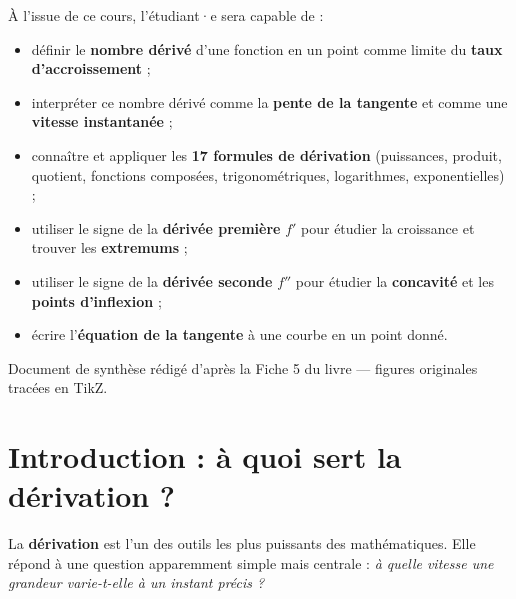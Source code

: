 \documentclass[11pt,a4paper]{article}
\begin{document}
\begin{tcolorbox}[boxbase,colback=primary!5,colframe=primary,width=15cm,
    title={\textsc{Objectifs pédagogiques de la fiche}}]
À l'issue de ce cours, l'étudiant·e sera capable de :
\begin{itemize}[leftmargin=1.6em,topsep=2pt,itemsep=1pt]
  \item définir le \textbf{nombre dérivé} d'une fonction en un point comme limite du \textbf{taux d'accroissement} ;
  \item interpréter ce nombre dérivé comme la \textbf{pente de la tangente} et comme une \textbf{vitesse instantanée} ;
  \item connaître et appliquer les \textbf{17 formules de dérivation} (puissances, produit, quotient, fonctions composées, trigonométriques, logarithmes, exponentielles) ;
  \item utiliser le signe de la \textbf{dérivée première} $f'$ pour étudier la croissance et trouver les \textbf{extremums} ;
  \item utiliser le signe de la \textbf{dérivée seconde} $f''$ pour étudier la \textbf{concavité} et les \textbf{points d'inflexion} ;
  \item écrire l'\textbf{équation de la tangente} à une courbe en un point donné.
\end{itemize}
\end{tcolorbox}

\vspace{0.4cm}
{\small\color{black!60} Document de synthèse rédigé d'après la Fiche 5 du livre — figures originales tracées en TikZ.}
\par
\endgroup

\newpage
\renewcommand{\contentsname}{\textcolor{primarydark}{Table des matières}}
\tableofcontents
\thispagestyle{fancy}
\newpage

\section{Introduction : à quoi sert la dérivation ?}
La \textbf{dérivation} est l'un des outils les plus puissants des mathématiques. Elle répond à une
question apparemment simple mais centrale : \emph{à quelle vitesse une grandeur varie-t-elle à un
instant précis ?}
\end{document}
